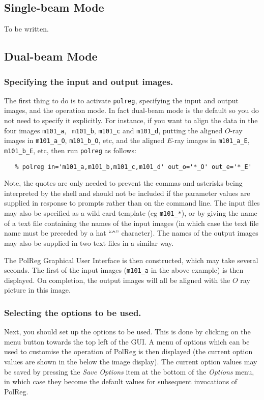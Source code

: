 \subsection {Single-beam Mode}
To be written.

\subsection {Dual-beam Mode}

\subsubsection {Specifying the input and output images.}
The first thing to do is to activate {\tt polreg}, specifying the input and
output images, and the operation mode. In fact dual-beam mode is the
default so you do not need to specify it explicitly. For instance, if
you want to align the data in the four images {\tt m101\_a}, {\tt
m101\_b}, {\tt m101\_c} and {\tt m101\_d}, putting the aligned $O$-ray
images in {\tt m101\_a\_O}, {\tt m101\_b\_O}, etc, and the aligned
$E$-ray images in {\tt m101\_a\_E}, {\tt m101\_b\_E}, etc, then run
{\tt polreg} as follows:

\begin{verbatim}
   % polreg in='m101_a,m101_b,m101_c,m101_d' out_o='*_O' out_e='*_E'
\end{verbatim}

Note, the quotes are only needed to prevent the commas and asterisks
being interpreted by the shell and should not be included if the
parameter values are supplied in response to prompts rather than on the
command line. The input files may also be specified as a wild card
template (eg {\verb+m101_*+}), or by giving the name of a text file
containing the names of the input images (in which case the text file
name must be preceded by a hat ``\verb+^+'' character). The names of the
output images may also be supplied in two text files in a similar way.

The PolReg Graphical User Interface is then constructed, which may take
several seconds. The first of the input images ({\tt m101\_a} in the
above example) is then displayed. On completion, the output images will all be
aligned with the $O$ ray picture in this image.

\subsubsection {Selecting the options to be used.}
Next, you should set up the options to be used. This is done by clicking
on the  menu button towards
the top left of the GUI. A menu of options which can be used to customise
the operation of PolReg is then displayed (the current option values are 
shown in the  below the image 
display). The current option values may be saved by pressing the {\em
Save Options} item at the bottom of the {\em Options} menu, in which case
they become the default values for subsequent invocations of PolReg.

